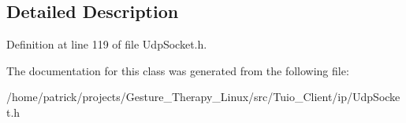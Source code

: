 \subsection{Detailed Description}


Definition at line 119 of file Udp\+Socket.\+h.



The documentation for this class was generated from the following file\+:\begin{DoxyCompactItemize}
\item 
/home/patrick/projects/\+Gesture\+\_\+\+Therapy\+\_\+\+Linux/src/\+Tuio\+\_\+\+Client/ip/Udp\+Socket.\+h\end{DoxyCompactItemize}
